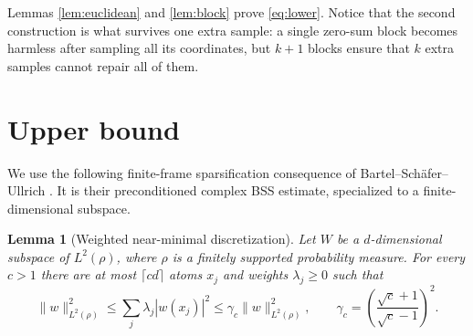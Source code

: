 \documentclass[11pt]{article}
\newtheorem{lemma}[theorem]{Lemma}
\begin{document}
Lemmas \ref{lem:euclidean} and \ref{lem:block} prove
\eqref{eq:lower}.  Notice that the second construction is what survives
one extra sample: a single zero-sum block becomes harmless after sampling
all its coordinates, but $k+1$ blocks ensure that $k$ extra samples cannot
repair all of them.

\section{Upper bound}

We use the following finite-frame sparsification consequence of
Bartel--Sch\"afer--Ullrich \cite{BSU}.  It is their preconditioned complex
BSS estimate, specialized to a finite-dimensional subspace.

\begin{lemma}[Weighted near-minimal discretization]\label{lem:bss}
Let $W$ be a $d$-dimensional subspace of $L^2(\rho)$, where $\rho$ is a
finitely supported probability measure.  For every $c>1$ there are at most
$\lceil cd\rceil$ atoms $x_j$ and weights $\lambda_j\geq0$ such that
\begin{equation}\label{eq:bss}
 \|w\|_{L^2(\rho)}^2
 \leq\sum_j\lambda_j|w(x_j)|^2
 \leq\gamma_c\|w\|_{L^2(\rho)}^2,
 \qquad
 \gamma_c=\left(\frac{\sqrt c+1}{\sqrt c-1}\right)^2.
\end{equation}
\end{lemma}
\end{document}

